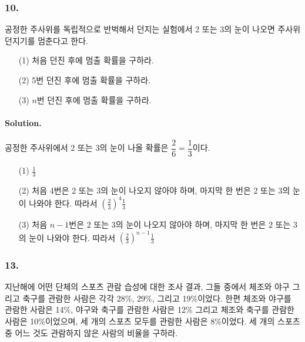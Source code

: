 \subsubsection{10.} 공정한 주사위를 독립적으로 반벅해서 던지는 실험에서 2 또는 3의 눈이 나오면 주사위 던지기를 멈춘다고 한다.
\begin{itemize}
	\item[(1)] 처음 던진 후에 멈출 확률을 구하라.
	\item[(2)] 5번 던진 후에 멈출 확률을 구하라.
	\item[(3)] $n$번 던진 후에 멈출 확률을 구하라.
\end{itemize}

\paragraph{Solution.} 공정한 주사위에서 2 또는 3의 눈이 나올 확률은 $\dfrac{2}{6} = \dfrac{1}{3}$이다.
\begin{itemize}
	\item[(1)] $\displaystyle \frac{1}{3}$
	\item[(2)] 처음 4번은 2 또는 3의 눈이 나오지 않아야 하며, 마지막 한 번은 2 또는 3의 눈이 나와야 한다. 따라서 $\displaystyle \left(\frac{2}{3}\right)^4\frac{1}{3}$
	\item[(3)] 처음 $n - 1$번은 2 또는 3의 눈이 나오지 않아야 하며, 마지막 한 번은 2 또는 3의 눈이 나와야 한다. 따라서 $\displaystyle \left(\frac{2}{3}\right)^{n - 1}\frac{1}{3}$
\end{itemize}

\subsubsection{13.} 지난해에 어떤 단체의 스포츠 관람 습성에 대한 조사 결과, 그들 중에서 체조와 야구 그리고 축구를 관람한 사람은 각각 28\%, 29\%, 그리고 19\%이었다. 한편 체조와 야구를 관람한 사람은 14\%, 야구와 축구를 관람한 사람은 12\% 그리고 체조와 축구를 관람한 사람은 10\%이었으며, 세 개의 스포츠 모두를 관람한 사람은 8\%이었다. 세 개의 스포츠 중 어느 것도 관람하지 않은 사람의 비율을 구하라.

